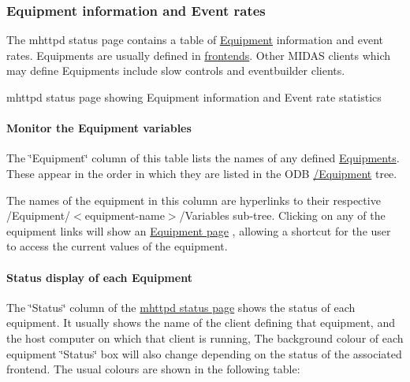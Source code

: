 \label{RC_mhttpd_status_page_features_idx_mhttpd_page_status_equipment}
\hypertarget{RC_mhttpd_status_page_features_idx_mhttpd_page_status_equipment}{}
 \hypertarget{RC_mhttpd_status_page_features_RC_mhttpd_status_Equipment_info}{}\subsubsection{Equipment information and Event rates}\label{RC_mhttpd_status_page_features_RC_mhttpd_status_Equipment_info}
The mhttpd status page contains a table of \hyperlink{FrontendOperation_FE_sw_equipment}{Equipment} information and event rates. Equipments are usually defined in \hyperlink{FrontendOperation_FE_features}{frontends}. Other MIDAS clients which may define Equipments include slow controls and eventbuilder clients.

\begin{center} mhttpd status page showing Equipment information and Event rate statistics  \end{center} \hypertarget{RC_mhttpd_status_page_features_RC_mhttpd_eq_variables}{}\paragraph{Monitor the Equipment variables}\label{RC_mhttpd_status_page_features_RC_mhttpd_eq_variables}
The \char`\"{}Equipment\char`\"{} column of this table lists the names of any defined \hyperlink{FrontendOperation_FE_sw_equipment}{Equipments}. These appear in the order in which they are listed in the ODB \hyperlink{FE_ODB_equipment_tree}{/Equipment} tree.

The names of the equipment in this column are hyperlinks to their respective /Equipment/$<$equipment-\/name$>$/Variables sub-\/tree. Clicking on any of the equipment links will show an \hyperlink{RC_mhttpd_Equipment_page}{Equipment page} , allowing a shortcut for the user to access the current values of the equipment. \par


\par
\hypertarget{RC_mhttpd_status_page_features_RC_mhttpd_eq_status}{}\paragraph{Status display of each Equipment}\label{RC_mhttpd_status_page_features_RC_mhttpd_eq_status}
The \char`\"{}Status\char`\"{} column of the \hyperlink{RC_mhttpd_status_page_features_RC_mhttpd_status_Equipment_info}{mhttpd status page} shows the status of each equipment. It usually shows the name of the client defining that equipment, and the host computer on which that client is running, The background colour of each equipment \char`\"{}Status\char`\"{} box will also change depending on the status of the associated frontend. The usual colours are shown in the following table:

